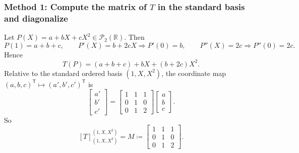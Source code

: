 \documentclass[12pt]{article}
\newcommand{\R}{\mathbb{R}}
\newcommand{\cP}{\mathcal{P}}
\begin{document}
\subsubsection{Method 1: Compute the matrix of $T$ in the standard basis and diagonalize}
Let $P(X)=a+bX+cX^2\in\cP_2(\R)$. Then
\[
P(1)=a+b+c,\qquad P'(X)=b+2cX\Rightarrow P'(0)=b,\qquad P''(X)=2c\Rightarrow P''(0)=2c.
\]
Hence
\[
T(P)=(a+b+c)+bX+(b+2c)X^2.
\]
Relative to the standard ordered basis $(1,X,X^2)$, the coordinate map $(a,b,c)^{\mathsf T}\mapsto (a',b',c')^{\mathsf T}$ is
\[
\begin{bmatrix}a'\\b'\\c'\end{bmatrix}
=
\begin{bmatrix}
1&1&1\\
0&1&0\\
0&1&2
\end{bmatrix}
\begin{bmatrix}a\\b\\c\end{bmatrix}.
\]
So
\[
[T]_{(1,X,X^2)}^{(1,X,X^2)}
=
M\coloneqq
\begin{bmatrix}
1&1&1\\
0&1&0\\
0&1&2
\end{bmatrix}.
\]
\end{document}
